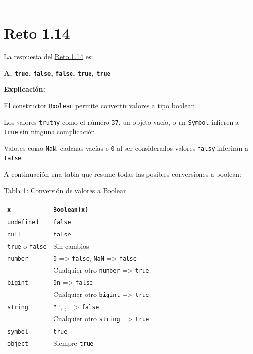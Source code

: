 \documentclass[
  letterpaper,
  DIV=11,
  numbers=noendperiod]{scrreprt}
\begin{document}
\begin{center}\rule{0.5\linewidth}{0.5pt}\end{center}

\section{Reto 1.14}\label{sec-sol-cap1-reto14}

La respuesta del \hyperref[sec-cap1-reto14]{Reto 1.14} es:

\textbf{A. \texttt{true}, \texttt{false}, \texttt{false}, \texttt{true},
\texttt{true}}

\textbf{Explicación:}

El constructor \texttt{Boolean} permite convertir valores a tipo
boolean.

Los valores \texttt{truthy} como el número \texttt{37}, un objeto vacío,
o un \texttt{Symbol} infieren a \texttt{true} sin ninguna complicación.

Valores como \texttt{NaN}, cadenas vacías o \texttt{0} al ser
considerados valores \texttt{falsy} inferirán a \texttt{false}.

A continuación una tabla que resume todas las posibles conversiones a
boolean:

\begin{center}
Tabla 1: Conversión de valores a Boolean
\end{center}

\begin{longtable}[]{@{}ll@{}}
\toprule\noalign{}
\texttt{x} & \texttt{Boolean(x)} \\
\midrule\noalign{}
\endhead
\bottomrule\noalign{}
\endlastfoot
\texttt{undefined} & \texttt{false} \\
\texttt{null} & \texttt{false} \\
\texttt{true} o \texttt{false} & Sin cambios \\
\texttt{number} & \texttt{0} =\textgreater{} \texttt{false},
\texttt{NaN} =\textgreater{} \texttt{false} \\
& Cualquier otro \texttt{number} =\textgreater{} \texttt{true} \\
\texttt{bigint} & \texttt{0n} =\textgreater{} \texttt{false} \\
& Cualquier otro \texttt{bigint} =\textgreater{} \texttt{true} \\
\texttt{string} & \texttt{""},
\texttt{\textquotesingle{}\textquotesingle{}},
\texttt{\textasciigrave{}\textasciigrave{}} =\textgreater{}
\texttt{false} \\
& Cualquier otro \texttt{string} =\textgreater{} \texttt{true} \\
\texttt{symbol} & \texttt{true} \\
\texttt{object} & Siempre \texttt{true} \\
\end{longtable}
\end{document}
